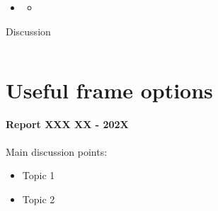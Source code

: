 \documentclass[8pt]{beamer}
\begin{document}
	\begin{frame}{}
	
	\end{frame}
	
	\begin{frame}{}
		\textbf{}\\~\\
		\begin{itemize}
			\item 
			\begin{itemize}
				\item 
			\end{itemize}
		\end{itemize}
	\end{frame}
	\begin{frame}{}
		
	\end{frame}
		\begin{frame}{Discussion}
		\begin{columns}
			
			
			
			
		\end{columns}
	\end{frame}
	

	\section*{Useful frame options}
	\label{}
	\justifying
	\begin{frame}
		\textbf{Report XXX XX - 202X}\\~\\
		Main discussion points:
		\begin{itemize}
			\item Topic 1
			\item Topic 2
		\end{itemize}
	\end{frame}
\end{document}
